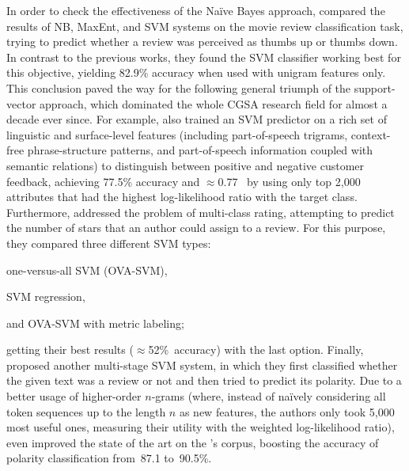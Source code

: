 In order to check the effectiveness of the Na{\"i}ve Bayes approach,
\citet{Pang:02} compared the results of NB, MaxEnt, and SVM systems on
the movie review classification task, trying to predict whether a
review was perceived as thumbs up or thumbs down.  In contrast to the
previous works, they found the SVM classifier working best for this
objective, yielding 82.9\% accuracy when used with unigram features
only.  This conclusion paved the way for the following general triumph
of the support-vector approach, which dominated the whole CGSA
research field for almost a decade ever since.  For example,
\citet{Gamon:04} also trained an SVM predictor on a rich set of
linguistic and surface-level features (including part-of-speech
trigrams, context-free phrase-structure patterns, and part-of-speech
information coupled with semantic relations) to distinguish between
positive and negative customer feedback, achieving 77.5\% accuracy and
$\approx$0.77~\F{} by using only top 2,000 attributes that had the
highest log-likelihood ratio with the target
class.  %
Furthermore, \citet{Pang:05} addressed the problem of multi-class
rating, attempting to predict the number of stars that an author could
assign to a review.  For this purpose, they compared three different
SVM types:
\begin{inparaenum}[(i)]
\item one-versus-all SVM (OVA-SVM),
\item SVM regression,
\item and OVA-SVM with metric labeling;
\end{inparaenum}
getting their best results ($\approx$52\%~accuracy) with the last
option.
Finally, \citet{Ng:06} proposed another multi-stage SVM system, in
which they first classified whether the given text was a review or not
and then tried to predict its polarity.  Due to a better usage of
higher-order $n$-grams (where, instead of na{\"i}vely considering all
token sequences up to the length $n$ as new features, the authors only
took 5,000 most useful ones, measuring their utility with the weighted
log-likelihood ratio), \citet{Ng:06} even improved the state of the
art on the \citeauthor{Pang:04}'s corpus, boosting the accuracy of
polarity classification from~87.1 to~90.5\%.

